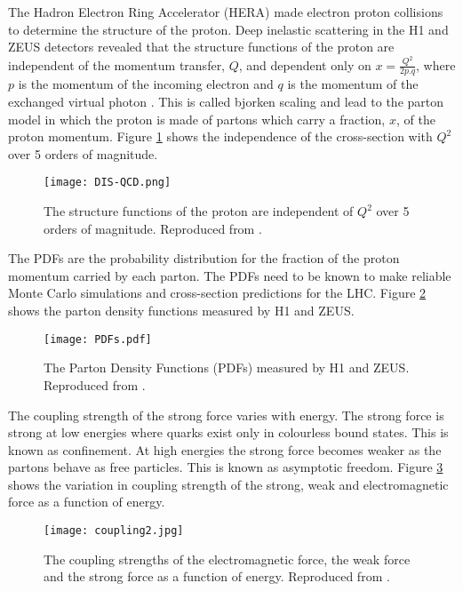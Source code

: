 The Hadron Electron Ring Accelerator (HERA) made electron proton collisions to
determine the structure of the proton. Deep inelastic scattering in the H1
\cite{h1} and ZEUS \cite{zeus} detectors revealed that the structure functions 
of the proton are independent of the momentum transfer, $Q$, and dependent only 
on $x = \frac{Q^{2}}{2p.q}$, where $p$ is the momentum of the incoming electron
and $q$ is the momentum of the exchanged virtual photon \cite{bjorken}. This is 
called bjorken scaling and lead to the parton model in which the proton is made 
of partons which carry a fraction, $x$, of the proton momentum. Figure 
\ref{fig:dis} shows the independence of the cross-section with $Q^{2}$ over 5 
orders of magnitude. \\

\begin{figure}
\begin{center}
\texttt{[image: DIS-QCD.png]}
\end{center}
\caption{The structure functions of the proton are independent of $Q^{2}$ over 5
orders of magnitude. Reproduced from \cite{h1andzeus}.}
\label{fig:dis}
\end{figure}

The PDFs are the probability distribution for the fraction of the proton 
momentum carried by each parton. The PDFs need to be known to make reliable 
Monte Carlo simulations and cross-section predictions for the LHC. Figure 
\ref{fig:pdfs} shows the parton density functions measured by H1 and ZEUS. \\

\begin{figure}
\begin{center}
\texttt{[image: PDFs.pdf]}
\end{center}
\caption{The Parton Density Functions (PDFs) measured by H1 and ZEUS. Reproduced
from \cite{h1andzeus}.}
\label{fig:pdfs}
\end{figure}

The coupling strength of the strong force varies with energy. The strong force 
is strong at low energies where quarks exist only in colourless bound states. 
This is known as confinement. At high energies the strong force becomes weaker 
as the partons behave as free particles. This is known as asymptotic freedom. 
Figure \ref{fig:coupling} shows the variation in coupling strength of the 
strong, weak and electromagnetic force as a function of energy.

\begin{figure}
\begin{center}
\texttt{[image: coupling2.jpg]}
\end{center}
\caption{The coupling strengths of the electromagnetic force, the weak force and
the strong force as a function of energy. Reproduced from \cite{nobel_2004}.}
\label{fig:coupling}
\end{figure}


